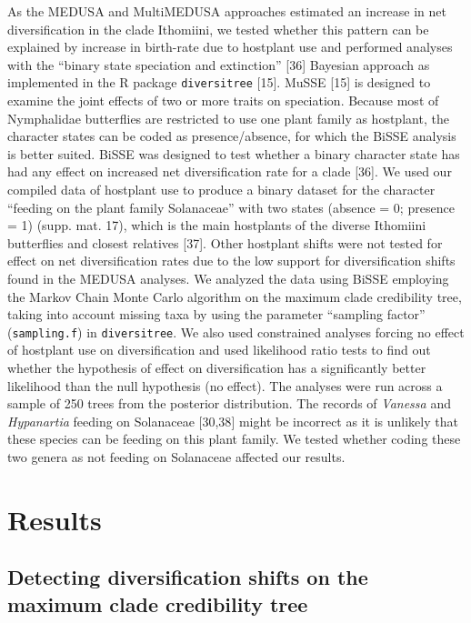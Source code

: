 \documentclass[10pt]{article}
\begin{document}
As the MEDUSA and MultiMEDUSA approaches estimated an increase in net
diversification in the clade Ithomiini, we tested whether this pattern
can be explained by increase in birth-rate due to hostplant use and
performed analyses with the ``binary state speciation and extinction''
{[}36{]} Bayesian approach as implemented in the R package
\texttt{diversitree} {[}15{]}. MuSSE {[}15{]} is designed to examine the
joint effects of two or more traits on speciation. Because most of
Nymphalidae butterflies are restricted to use one plant family as
hostplant, the character states can be coded as presence/absence, for
which the BiSSE analysis is better suited. BiSSE was designed to test
whether a binary character state has had any effect on increased net
diversification rate for a clade {[}36{]}. We used our compiled data of
hostplant use to produce a binary dataset for the character ``feeding on
the plant family Solanaceae'' with two states (absence = 0; presence =
1) (supp. mat. 17), which is the main hostplants of the diverse
Ithomiini butterflies and closest relatives {[}37{]}. Other hostplant
shifts were not tested for effect on net diversification rates due to
the low support for diversification shifts found in the MEDUSA analyses.
We analyzed the data using BiSSE employing the Markov Chain Monte Carlo
algorithm on the maximum clade credibility tree, taking into account
missing taxa by using the parameter ``sampling factor''
(\texttt{sampling.f}) in \texttt{diversitree}. We also used constrained
analyses forcing no effect of hostplant use on diversification and used
likelihood ratio tests to find out whether the hypothesis of effect on
diversification has a significantly better likelihood than the null
hypothesis (no effect). The analyses were run across a sample of 250
trees from the posterior distribution. The records of \emph{Vanessa} and
\emph{Hypanartia} feeding on Solanaceae {[}30,38{]} might be incorrect
as it is unlikely that these species can be feeding on this plant
family. We tested whether coding these two genera as not feeding on
Solanaceae affected our results.

\section*{Results}

\subsection*{Detecting diversification shifts on the maximum clade credibility tree}
\end{document}
